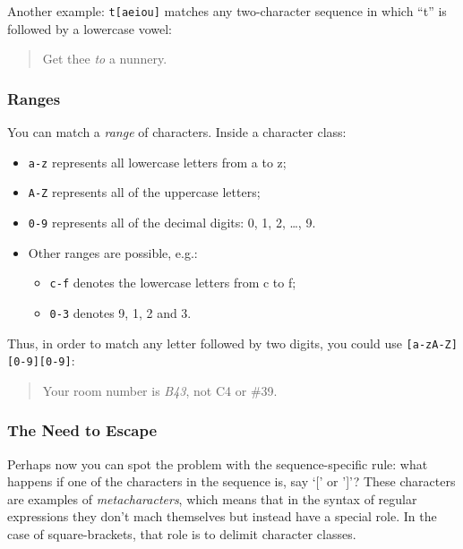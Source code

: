 \documentclass[]{book}
\providecommand{\tightlist}{%
  \setlength{\itemsep}{0pt}\setlength{\parskip}{0pt}}
\theoremstyle{definition}
\theoremstyle{definition}
\theoremstyle{definition}
\theoremstyle{remark}
\begin{document}
{Another example: \texttt{t{[}aeiou{]}} matches any two-character
sequence in which ``t'' is followed by a lowercase vowel:

\begin{quote}
Get thee \emph{to} a nunnery.
\end{quote}

\subsubsection{Ranges}\label{ranges}

You can match a \emph{range}  of characters.
Inside a character class:

\begin{itemize}
\tightlist
\item
  \texttt{a-z} represents all lowercase letters from a to z;
\item
  \texttt{A-Z} represents all of the uppercase letters;
\item
  \texttt{0-9} represents all of the decimal digits: 0, 1, 2, \ldots{},
  9.
\item
  Other ranges are possible, e.g.:

  \begin{itemize}
  \tightlist
  \item
    \texttt{c-f} denotes the lowercase letters from c to f;
  \item
    \texttt{0-3} denotes 9, 1, 2 and 3.
  \end{itemize}
\end{itemize}

Thus, in order to match any letter followed by two digits, you could use
\texttt{{[}a-zA-Z{]}{[}0-9{]}{[}0-9{]}}:

\begin{quote}
Your room number is \emph{B43}, not C4 or \#39.
\end{quote}

\subsubsection{The Need to Escape}\label{the-need-to-escape}

Perhaps now you can spot the problem with the sequence-specific rule:
what happens if one of the characters in the sequence is, say `{[}' or
'{]}'? These characters are examples of \emph{metacharacters},
 which means that in the syntax of regular
expressions they don't mach themselves but instead have a special role.
In the case of square-brackets, that role is to delimit character
classes.

}
\end{document}
